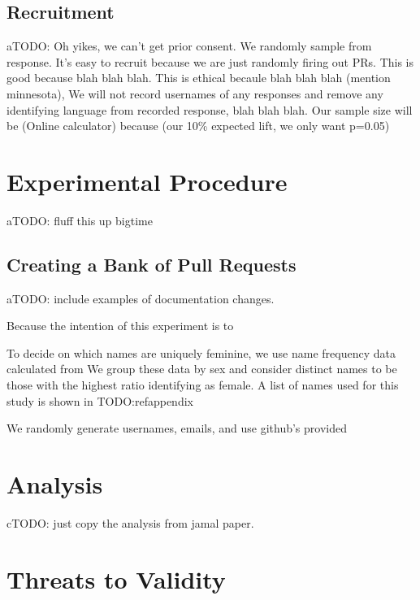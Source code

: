 \documentclass[journal,12pt,onecolumn,]{IEEEtran}
\begin{document}
\subsection{Recruitment}

aTODO: Oh yikes, we can't get prior consent. We randomly sample from response. It's easy to recruit because we are just randomly firing out PRs. This is good because blah blah blah. This is ethical becaule blah blah blah (mention minnesota), We will not record usernames of any responses and remove any identifying language from recorded response, blah blah blah.
Our sample size will be (Online calculator) because (our 10\% expected lift, we only want p=0.05)

\section{Experimental Procedure}

aTODO: fluff this up bigtime

\subsection{Creating a Bank of Pull Requests} %

aTODO: include examples of documentation changes.

Because the intention of this experiment is to

To decide on which names are uniquely feminine, we use name frequency data calculated from %
We group these data by sex and consider distinct names to be those with the highest ratio identifying as female.
A list of names used for this study is shown in TODO:refappendix%

We randomly generate usernames, emails, and use github's provided


\section{Analysis}

cTODO: just copy the analysis from jamal paper.

\section{Threats to Validity}
\end{document}
